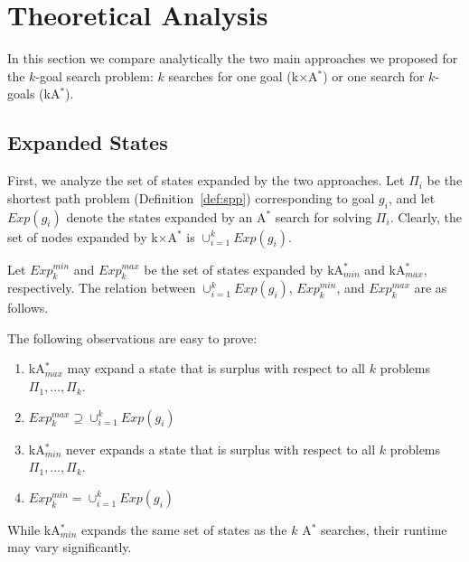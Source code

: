 \documentclass{aicom2e}
\newcommand{\kgs}{$k$-goal search}
\newcommand{\astar}{A$^*$}
\newcommand{\kastar}{kA$^*$}
\newcommand{\kastarmin}{kA$^*_{min}$}
\newcommand{\kastarmax}{kA$^*_{max}$}
\newcommand{\kxastar}{k$\times$A$^*$}
\begin{document}
	



\section{Theoretical Analysis}
In this section we compare analytically the two main approaches we proposed for the \kgs{} problem: $k$ searches for one goal (\kxastar{}) or one search for $k$-goals (\kastar{}). 
\subsection{Expanded States}
First, we analyze the set of states expanded by the two approaches. Let $\Pi_i$ be the shortest path problem (Definition~\ref{def:spp}) corresponding to goal $g_i$, and let $Exp(g_i)$ denote the states expanded by an \astar{} search for solving $\Pi_i$. Clearly, the set of nodes expanded by \kxastar{} is $\cup_{i=1}^k Exp(g_i)$.

Let $Exp_{k}^{min}$ and $Exp_{k}^{max}$ be the set of states expanded by \kastarmin{} and \kastarmax{}, respectively. The relation between $\cup_{i=1}^k Exp(g_i)$, $Exp_{k}^{min}$, and $Exp_{k}^{max}$ are as follows. 


The following observations are easy to prove:
	\begin{enumerate}
	\item \kastarmax{} may expand a state that is surplus with respect to all $k$ problems $\Pi_1,\ldots,\Pi_k$. 
	\item $Exp_k^{max} \supseteq \cup_{i=1}^k Exp(g_i)$
	\item \kastarmin{} never expands a state that is surplus with respect to all $k$ problems $\Pi_1,\ldots,\Pi_k$. 
	\item $Exp_k^{min} = \cup_{i=1}^k Exp(g_i)$
\end{enumerate}

While \kastarmin{} expands the same set of states as the $k$ \astar{} searches, 
their runtime may vary significantly. 
\end{document}

